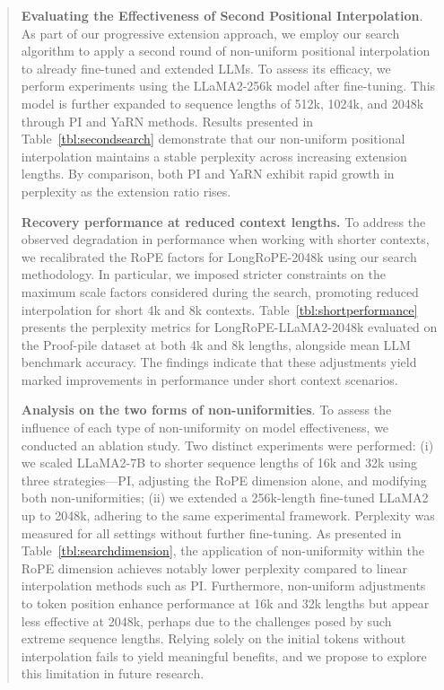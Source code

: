 \begin{abstract}
\textbf{Evaluating the Effectiveness of Second Positional Interpolation}. As part of our progressive extension approach, we employ our search algorithm to apply a second round of non-uniform positional interpolation to already fine-tuned and extended LLMs. To assess its efficacy, we perform experiments using the LLaMA2-256k model after fine-tuning. This model is further expanded to sequence lengths of 512k, 1024k, and 2048k through PI and YaRN methods. Results presented in Table~\ref{tbl:secondsearch} demonstrate that our non-uniform positional interpolation maintains a stable perplexity across increasing extension lengths. By comparison, both PI and YaRN exhibit rapid growth in perplexity as the extension ratio rises.

\textbf{Recovery performance at reduced context lengths.} To address the observed degradation in performance when working with shorter contexts, we recalibrated the RoPE factors for LongRoPE-2048k using our search methodology. In particular, we imposed stricter constraints on the maximum scale factors considered during the search, promoting reduced interpolation for short 4k and 8k contexts. Table~\ref{tbl:shortperformance} presents the perplexity metrics for LongRoPE-LLaMA2-2048k evaluated on the Proof-pile dataset at both 4k and 8k lengths, alongside mean LLM benchmark accuracy. The findings indicate that these adjustments yield marked improvements in performance under short context scenarios.

\textbf{Analysis on the two forms of non-uniformities}. To assess the influence of each type of non-uniformity on model effectiveness, we conducted an ablation study. Two distinct experiments were performed: (i) we scaled LLaMA2-7B to shorter sequence lengths of 16k and 32k using three strategies—PI, adjusting the RoPE dimension alone, and modifying both non-uniformities; (ii) we extended a 256k-length fine-tuned LLaMA2 up to 2048k, adhering to the same experimental framework. Perplexity was measured for all settings without further fine-tuning. As presented in Table~\ref{tbl:searchdimension}, the application of non-uniformity within the RoPE dimension achieves notably lower perplexity compared to linear interpolation methods such as PI. Furthermore, non-uniform adjustments to token position enhance performance at 16k and 32k lengths but appear less effective at 2048k, perhaps due to the challenges posed by such extreme sequence lengths. Relying solely on the initial tokens without interpolation fails to yield meaningful benefits, and we propose to explore this limitation in future research.


\end{abstract}
